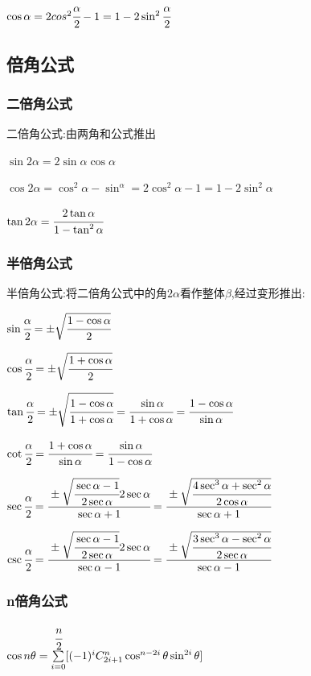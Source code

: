 \documentclass[UTF8,12pt]{ctexbook}
\newcommand{\mathCombination}[2]{C_{#1}^{#2}}
\newcommand{\upDownSum}[2]{\sum\limits_{#2}^{#1}}
\begin{document}
{{{{    $\cos\alpha = 2cos^2\cfrac{\alpha}{2} - 1 = 1-2\sin^2\cfrac{\alpha}{2}$
  }%

}%

\subsection{倍角公式}{

  \subsubsection{二倍角公式}{
    二倍角公式:由两角和公式推出

    $\sin2\alpha = 2\sin\alpha\cos\alpha$

    $\cos2\alpha = \cos^2\alpha - \sin^\alpha = 2\cos^2\alpha - 1 = 1 - 2\sin^2\alpha$

    $\tan2\alpha = \cfrac{2\tan\alpha}{1 - \tan^2\alpha}$
  }%

  \subsubsection{半倍角公式}{
    半倍角公式:将二倍角公式中的角$2\alpha$看作整体$\beta$,经过变形推出:

    $\sin\cfrac{\alpha}{2} = \pm\sqrt{\cfrac{1 - \cos\alpha}{2}}$

    $\cos\cfrac{\alpha}{2} = \pm\sqrt{\cfrac{1 + \cos\alpha}{2}}$

    $\tan\cfrac{\alpha}{2} = \pm\sqrt{\cfrac{1-\cos\alpha}{1+\cos\alpha}} = \cfrac{\sin\alpha}{1+\cos\alpha} = \cfrac{1-\cos\alpha}{\sin\alpha}$

    $\cot\cfrac{\alpha}{2} = \cfrac{1+\cos\alpha}{\sin\alpha} = \cfrac{\sin\alpha}{1-\cos\alpha}$

    $\sec\cfrac{\alpha}{2} = \cfrac{\pm\sqrt{\cfrac{\sec\alpha - 1}{2\sec\alpha}}2\sec\alpha}{\sec\alpha + 1} = \cfrac{\pm\sqrt{\cfrac{4\sec^3\alpha + \sec^2\alpha}{2\cos\alpha}}}{\sec\alpha + 1}$

    $\csc\cfrac{\alpha}{2} = \cfrac{\pm\sqrt{\cfrac{\sec\alpha - 1}{2\sec\alpha}}2\sec\alpha}{\sec\alpha - 1} = \cfrac{\pm\sqrt{\cfrac{3\sec^3\alpha - \sec^2\alpha}{2\sec\alpha}}}{\sec\alpha - 1}$
  }%

  \subsubsection{n倍角公式}{
    $\cos{n\theta} = \upDownSum{\cfrac{n}{2}}{i = 0}[(-1)^i\mathCombination{2i + 1}{n}\cos^{n - 2i}\theta\sin^{2i}\theta]$

}}}}
\end{document}
